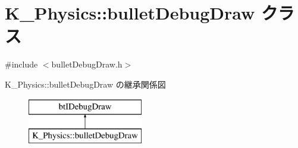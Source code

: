 \hypertarget{class_k___physics_1_1bullet_debug_draw}{}\section{K\+\_\+\+Physics\+:\+:bullet\+Debug\+Draw クラス}
\label{class_k___physics_1_1bullet_debug_draw}


{\ttfamily \#include $<$bullet\+Debug\+Draw.\+h$>$}

K\+\_\+\+Physics\+:\+:bullet\+Debug\+Draw の継承関係図\begin{figure}[H]
\begin{center}
\leavevmode
\includegraphics[height=2.000000cm]{class_k___physics_1_1bullet_debug_draw}
\end{center}
\end{figure}
